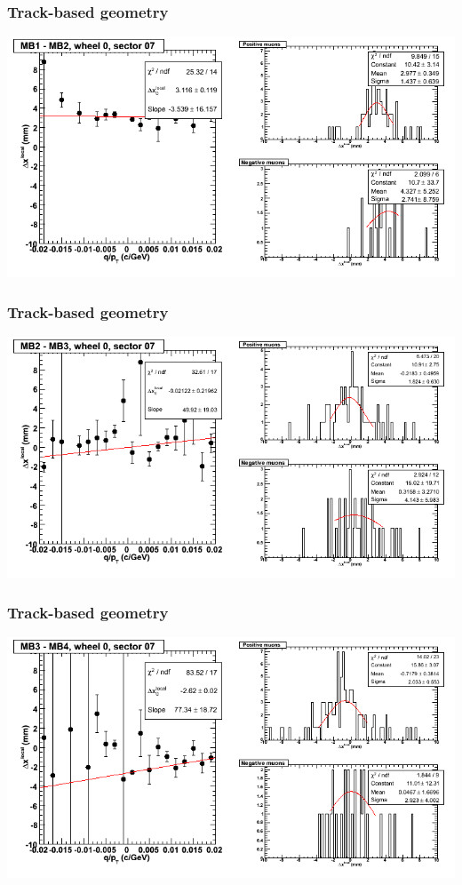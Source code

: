 \documentclass[compress]{beamer}
\begin{document}
\begin{frame}
\frametitle{Track-based geometry}
\includegraphics[width=\linewidth]{NOV4_segdiffs/dt13_resid_C_07_12.png}
\end{frame}

\begin{frame}
\frametitle{Track-based geometry}
\includegraphics[width=\linewidth]{NOV4_segdiffs/dt13_resid_C_07_23.png}
\end{frame}

\begin{frame}
\frametitle{Track-based geometry}
\includegraphics[width=\linewidth]{NOV4_segdiffs/dt13_resid_C_07_34.png}
\end{frame}
\end{document}
